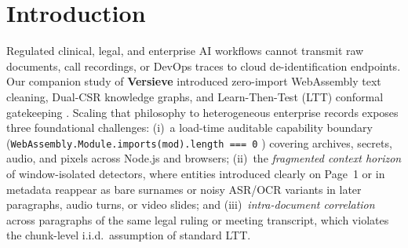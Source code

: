 \documentclass{article}
\begin{document}
\section{Introduction}
\label{sec:intro}

Regulated clinical, legal, and enterprise AI workflows cannot transmit raw documents, call recordings, or DevOps traces to cloud de-identification endpoints. Our companion study of \textbf{Versieve} \citep{ardiyansyah2026versieve} introduced zero-import WebAssembly text cleaning, Dual-CSR knowledge graphs, and Learn-Then-Test (LTT) conformal gatekeeping \citep{angelopoulos2021ltt}. Scaling that philosophy to heterogeneous enterprise records exposes three foundational challenges: (i)~a load-time auditable capability boundary (\texttt{WebAssembly.Module.imports(mod).length === 0} \citep{haas2017wasm}) covering archives, secrets, audio, and pixels across Node.js and browsers; (ii)~the \emph{fragmented context horizon} of window-isolated detectors, where entities introduced clearly on Page~1 or in metadata reappear as bare surnames or noisy ASR/OCR variants in later paragraphs, audio turns, or video slides; and (iii)~\emph{intra-document correlation} across paragraphs of the same legal ruling or meeting transcript, which violates the chunk-level i.i.d.\ assumption of standard LTT.
\end{document}

